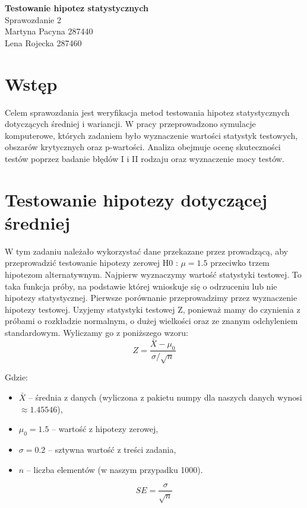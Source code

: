 \documentclass[12pt, a4paper]{article}
\begin{document}
	
	\begin{center}
		\Huge \textbf{Testowanie hipotez statystycznych } \\[0.5em]
		\large Sprawozdanie 2 \\[1.5em]
		\Large Martyna Pacyna 287440 \\ Lena Rojecka 287460
	\end{center}
	
	\section{Wstęp}
		Celem sprawozdania jest weryfikacja metod testowania hipotez statystycznych dotyczących średniej i wariancji. W pracy przeprowadzono symulacje komputerowe, których zadaniem było wyznaczenie wartości statystyk testowych, obszarów krytycznych oraz p-wartości. Analiza obejmuje ocenę skuteczności testów poprzez badanie błędów I i II rodzaju oraz wyznaczenie mocy testów.
	\section{Testowanie hipotezy dotyczącej średniej}
		W tym zadaniu należało wykorzystać dane przekazane przez prowadzącą, aby przeprowadzić testowanie hipotezy zerowej H0 : $\mu = 1.5$ przeciwko trzem hipotezom alternatywnym. Najpierw wyznaczymy wartość statystyki testowej. To taka funkcja próby, na podstawie której wnioskuje się o odrzuceniu lub nie hipotezy statystycznej. Pierwsze porównanie przeprowadzimy przez wyznaczenie hipotezy testowej. Uzyjemy statystyki testowej Z, ponieważ mamy do czynienia z próbami o rozkładzie normalnym, o dużej wielkości oraz ze znanym odchyleniem standardowym. Wyliczamy go z poniższego wzoru: 
		\begin{equation*}
			Z = \frac{\bar{X} - \mu_0}{\sigma / \sqrt{n}}
		\end{equation*}
		
		Gdzie:
		\begin{itemize}
			\item $\bar{X}$ -- średnia z danych (wyliczona z pakietu numpy dla naszych danych wynosi $\approx 1.45546$),
			\item $\mu_0 = 1.5$ -- wartość z hipotezy zerowej,
			\item $\sigma = 0.2$ -- sztywna wartość z treści zadania,
			\item $n$ -- liczba elementów (w naszym przypadku 1000).
		\end{itemize}
				
		\begin{equation*}
			SE = \frac{\sigma}{\sqrt{n}}
		\end{equation*}
		
\end{document}
